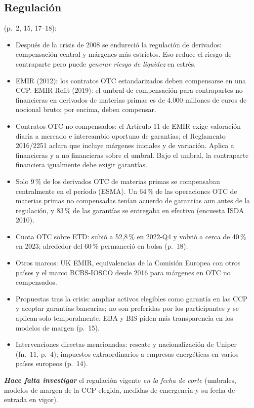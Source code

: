 \documentclass{article} %
\newcommand{\pg}[1]{(p.~#1)}
\begin{document}
    \subsection{Regulación}

        \pg{2, 15, 17--18}:

        \begin{itemize}
        \item Después de la crisis de 2008 se endureció la regulación de derivados: compensación central y márgenes más estrictos. Eso reduce el riesgo de contraparte pero puede \emph{generar riesgo de liquidez} en estrés.
        \item EMIR (2012): los contratos OTC estandarizados deben compensarse en una CCP. EMIR Refit (2019): el umbral de compensación para contrapartes no financieras en derivados de materias primas es de 4.000 millones de euros de nocional bruto; por encima, deben compensar.
        \item Contratos OTC no compensados: el Artículo 11 de EMIR exige valoración diaria a mercado e intercambio oportuno de garantías; el Reglamento 2016/2251 aclara que incluye márgenes iniciales y de variación. Aplica a financieras y a no financieras sobre el umbral. Bajo el umbral, la contraparte financiera igualmente debe exigir garantías.
        \item Solo 9\,\% de los derivados OTC de materias primas se compensaban centralmente en el período (ESMA). Un 64\,\% de las operaciones OTC de materias primas no compensadas tenían acuerdo de garantías aun antes de la regulación, y 83\,\% de las garantías se entregaba en efectivo (encuesta ISDA 2010).
        \item Cuota OTC sobre ETD: subió a 52,8\,\% en 2022-Q4 y volvió a cerca de 40\,\% en 2023; alrededor del 60\,\% permaneció en bolsa \pg{18}.
        \item Otros marcos: UK EMIR, equivalencias de la Comisión Europea con otros países y el marco BCBS-IOSCO desde 2016 para márgenes en OTC no compensados.
        \item Propuestas tras la crisis: ampliar activos elegibles como garantía en las CCP y aceptar garantías bancarias; no son preferidas por los participantes y se aplican solo temporalmente. EBA y BIS piden más transparencia en los modelos de margen \pg{15}.
        \item Intervenciones directas mencionadas: rescate y nacionalización de Uniper (fn.~11, p.~4); impuestos extraordinarios a empresas energéticas en varios países europeos (p.~14).
        \end{itemize}
        \textit{\textbf{Hace falta investigar}} el regulación vigente \emph{en la fecha de corte} (umbrales, modelos de margen de la CCP elegida, medidas de emergencia y su fecha de entrada en vigor).
\end{document}
